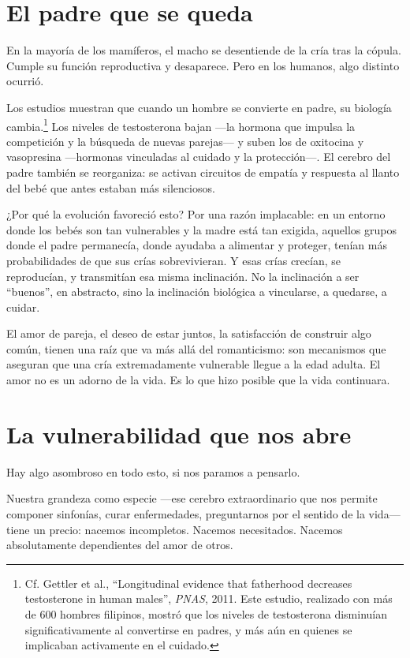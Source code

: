 \section{El padre que se queda}

En la mayoría de los mamíferos, el macho se desentiende de la cría tras la cópula. Cumple su función reproductiva y desaparece. Pero en los humanos, algo distinto ocurrió.

Los estudios muestran que cuando un hombre se convierte en padre, su biología cambia.\footnote{Cf. Gettler et al., ``Longitudinal evidence that fatherhood decreases testosterone in human males'', \textit{PNAS}, 2011. Este estudio, realizado con más de 600 hombres filipinos, mostró que los niveles de testosterona disminuían significativamente al convertirse en padres, y más aún en quienes se implicaban activamente en el cuidado.} Los niveles de testosterona bajan ---la hormona que impulsa la competición y la búsqueda de nuevas parejas--- y suben los de oxitocina y vasopresina ---hormonas vinculadas al cuidado y la protección---. El cerebro del padre también se reorganiza: se activan circuitos de empatía y respuesta al llanto del bebé que antes estaban más silenciosos.

¿Por qué la evolución favoreció esto? Por una razón implacable: en un entorno donde los bebés son tan vulnerables y la madre está tan exigida, aquellos grupos donde el padre permanecía, donde ayudaba a alimentar y proteger, tenían más probabilidades de que sus crías sobrevivieran. Y esas crías crecían, se reproducían, y transmitían esa misma inclinación. No la inclinación a ser ``buenos'', en abstracto, sino la inclinación biológica a vincularse, a quedarse, a cuidar.

El amor de pareja, el deseo de estar juntos, la satisfacción de construir algo común, tienen una raíz que va más allá del romanticismo: son mecanismos que aseguran que una cría extremadamente vulnerable llegue a la edad adulta. El amor no es un adorno de la vida. Es lo que hizo posible que la vida continuara.

\section{La vulnerabilidad que nos abre}

Hay algo asombroso en todo esto, si nos paramos a pensarlo.

Nuestra grandeza como especie ---ese cerebro extraordinario que nos permite componer sinfonías, curar enfermedades, preguntarnos por el sentido de la vida--- tiene un precio: nacemos incompletos. Nacemos necesitados. Nacemos absolutamente dependientes del amor de otros.

